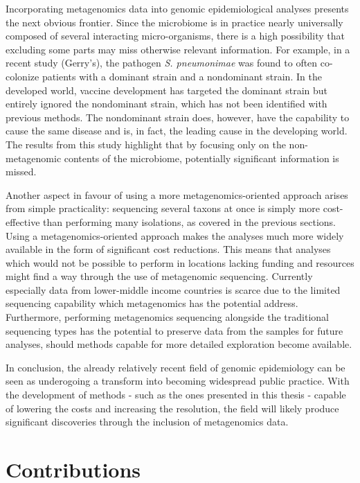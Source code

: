 \documentclass[officiallayout]{tktla}
\begin{document}
Incorporating metagenomics data into genomic epidemiological analyses
presents the next obvious frontier. Since the microbiome is in
practice nearly universally composed of several interacting
micro-organisms, there is a high possibility that excluding some parts
may miss otherwise relevant information. For example, in a recent
study (Gerry's), the pathogen \textit{S. pneumonimae} was found to
often co-colonize patients with a dominant strain and a nondominant
strain. In the developed world, vaccine development has targeted the
dominant strain but entirely ignored the nondominant strain, which has
not been identified with previous methods. The nondominant strain
does, however, have the capability to cause the same disease and is,
in fact, the leading cause in the developing world. The results from
this study highlight that by focusing only on the non-metagenomic
contents of the microbiome, potentially significant information is
missed.

Another aspect in favour of using a more metagenomics-oriented
approach arises from simple practicality: sequencing several taxons at
once is simply more cost-effective than performing many isolations, as
covered in the previous sections. Using a metagenomics-oriented
approach makes the analyses much more widely available in the form of
significant cost reductions. This means that analyses which would not
be possible to perform in locations lacking funding and resources
might find a way through the use of metagenomic sequencing. Currently
especially data from lower-middle income countries is scarce due to
the limited sequencing capability which metagenomics has the potential
address. Furthermore, performing metagenomics sequencing alongside the
traditional sequencing types has the potential to preserve data from
the samples for future analyses, should methods capable for more
detailed exploration become available.

In conclusion, the already relatively recent field of genomic
epidemiology can be seen as underogoing a transform into becoming
widespread public practice. With the development of methods - such as
the ones presented in this thesis - capable of lowering the costs and
increasing the resolution, the field will likely produce significant
discoveries through the inclusion of metagenomics data.

\section{Contributions}
\end{document}
